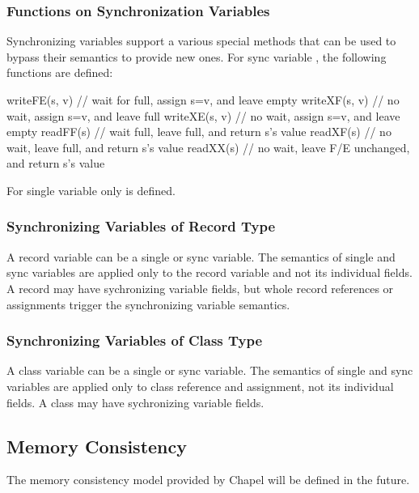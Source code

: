 \subsubsection{Functions on Synchronization Variables}
\label{Functions_on_Synchronization_Variables}

Synchronizing variables support a various special methods that
can be used to bypass their semantics to provide new ones. For
sync variable , the following functions are defined:
\begin{chapel}
writeFE(s, v) // wait for full, assign s=v, and leave empty
writeXF(s, v) // no wait, assign s=v, and leave full
writeXE(s, v) // no wait, assign s=v, and leave empty
readFF(s)     // wait full, leave full, and return s's value
readXF(s)     // no wait, leave full, and return s's value
readXX(s)     // no wait, leave F/E unchanged, and return s's value
\end{chapel}

For single variable  only  is defined.


\subsubsection{Synchronizing Variables of Record Type}
\label{Synchronization_Variables_of_Record_Type}

A record variable can be a single or sync variable. The semantics of single 
and sync variables are applied only to the record variable and not
its individual fields. A record may have sychronizing variable fields,
but whole record references or assignments trigger the synchronizing
variable semantics. 

\subsubsection{Synchronizing Variables of Class Type}
\label{Synchronization_Variables_of_Class_Type}

A class variable can be a single or sync variable. The semantics of
single and sync variables are applied only to class reference and
assignment, not its individual fields. A class may have sychronizing
variable fields.


\subsection{Memory Consistency}
\label{Memory_Consistency}
The memory consistency model provided by Chapel will be defined in the future.

